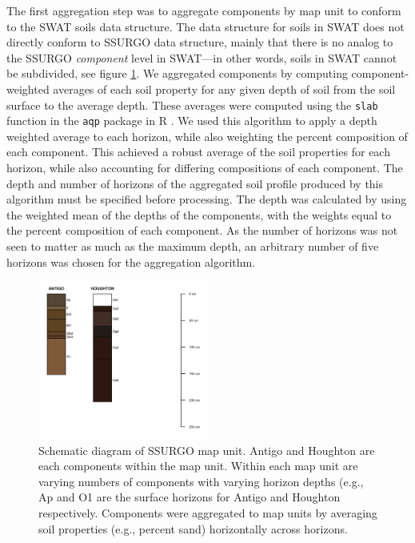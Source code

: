 The first aggregation step was to aggregate components by map unit to conform to
the SWAT soils data structure. The data structure for soils in SWAT does not
directly conform to SSURGO data structure, mainly that there is no analog to the
SSURGO \textit{component} level in SWAT---in other words, soils in SWAT cannot
be subdivided, see figure \ref{fig:component_schematic}. We aggregated components by computing
component-weighted averages of each soil property for any given depth of soil from the soil surface to the average depth\cite{gatzke_aggregation_2011, beaudette_algorithms_2013}.
These averages were computed using the \texttt{slab} function in the \texttt{aqp} package in R \cite{beaudette_algorithms_2013}. We
used this algorithm to apply a depth weighted average to each horizon, while
also weighting the percent composition of each component. This achieved a robust
average of the soil properties for each horizon, while also accounting for
differing compositions of each component. The depth and number of horizons of
the aggregated soil profile produced by this algorithm must be specified before
processing. The depth was calculated by using the weighted mean of the depths of
the components, with the weights equal to the percent composition of each
component. As the number of horizons was not seen to matter as much as the
maximum depth, an arbitrary number of five horizons was chosen for the
aggregation algorithm.

\begin{figure}[h]
  \centering
    \includegraphics[width=0.5\textwidth]{./img/component_schematic.png}
	\caption[Schematic diagram of SSURGO map unit]{Schematic diagram of SSURGO map unit. Antigo and Houghton are each components within the map unit. Within each map unit are varying numbers of components with varying horizon depths (e.g., Ap and O1 are the surface horizons for Antigo and Houghton respectively. Components were aggregated to map units by averaging soil properties (e.g., percent sand) horizontally across horizons.}
	\label{fig:component_schematic}
\end{figure}

